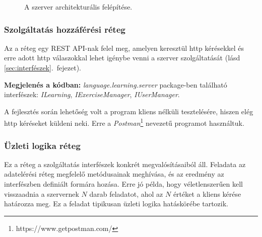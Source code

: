 \documentclass[11pt, a4paper]{article}
\begin{document}
    \begin{figure}[htbp]
    	\center
    	\caption{A szerver architekturális felépítése.}
    	\label{fig:server_arch}
    \end{figure}
    
    \subsubsection{Szolgáltatás hozzáférési réteg}
    Az a réteg egy REST API-nak felel meg, amelyen keresztül http kérésekkel és erre adott http válaszokkal lehet igénybe venni a szerver szolgáltatását (lásd \ref{sec:interfészek}.~fejezet).
    
    \textbf{Megjelenés a kódban:} \textit{language.learning.server} package-ben található interfészek: \textsl{ILearning}, \textsl{IExerciseManager}, \textsl{IUserManager}.
    
    A fejlesztés során lehetőség volt a program kliens nélküli tesztelésére, hiszen elég http kéréseket küldeni neki. Erre a \textit{Postman}\footnote{https://www.getpostman.com/} nevezetű programot használtuk.
    
    \subsubsection{Üzleti logika réteg}
    Ez a réteg a szolgáltatás interfészek konkrét megvalósításaiból áll. Feladata az adatelérési réteg megfelelő metódusainak meghívása, és az eredmény az interfészben definiált formára hozása. Erre jó példa, hogy véletlenszerűen kell visszaadnia a szervernek $N$ darab feladatot, ahol az $N$ értéket a kliens kérése határozza meg. Ez a feladat tipikusan üzleti logika hatáskörébe tartozik.
    
\end{document}
